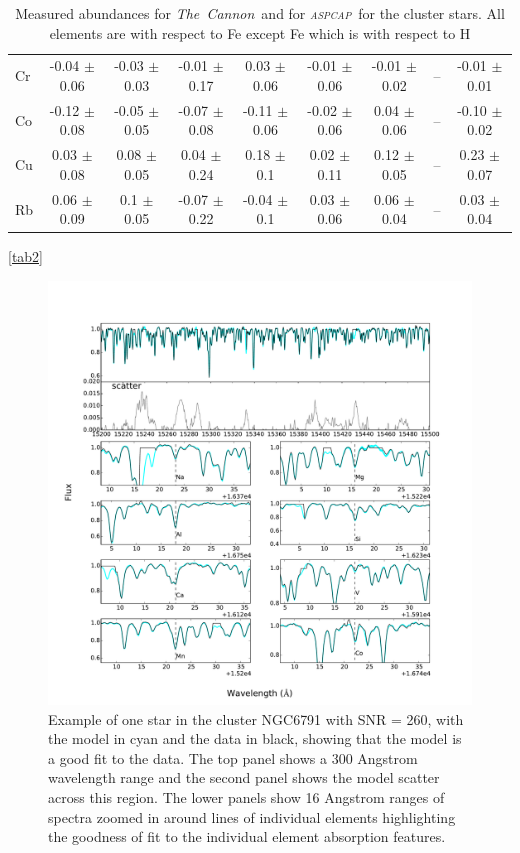 \documentclass[14pt, preprint2]{aastex6}
\newcommand{\project}[1]{\textsl{#1}}
\newcommand{\tc}{\project{The~Cannon}}
\newcommand{\aspcap}{\project{\textsc{aspcap}}}
\begin{document}
\begin{table}[h]
\begin{tabular}{ | p{} | c| c | c | c | c | c | c | c | }
Cr & -0.04 $\pm$ 0.06 &  -0.03 $\pm$ 0.03 &  -0.01 $\pm$ 0.17  & 0.03 $\pm$ 0.06 & -0.01 $\pm$ 0.06  &-0.01 $\pm$ 0.02  &  -- & -0.01 $\pm$ 0.01 \\
Co & -0.12 $\pm$ 0.08 & -0.05 $\pm$ 0.05  & -0.07 $\pm$ 0.08 & -0.11 $\pm$ 0.06 & -0.02 $\pm$ 0.06 & 0.04 $\pm$ 0.06 & --  & -0.10 $\pm$ 0.02 \\
Cu & 0.03 $\pm$ 0.08  &  0.08 $\pm$ 0.05  & 0.04 $\pm$ 0.24 & 0.18 $\pm$ 0.1  & 0.02 $\pm$ 0.11  & 0.12 $\pm$ 0.05  & --  & 0.23 $\pm$ 0.07 \\
Rb & 0.06 $\pm$ 0.09 & 0.1 $\pm$ 0.05  & -0.07 $\pm$ 0.22  & -0.04 $\pm$ 0.1 & 0.03 $\pm$ 0.06  & 0.06 $\pm$ 0.04  & --  &  0.03 $\pm$ 0.04 \\
 \hline
\end{tabular}
\caption{Measured abundances for \tc\ and for \aspcap\ for the cluster stars. All elements are with respect to Fe except Fe which is with respect to H}
\ref{tab2}
\end{table}

\begin{figure}
\centering
           \includegraphics[scale=0.5]{elementfit.pdf}
  \caption{ Example of one star in the cluster NGC6791 with SNR = 260, with the model in cyan and the data in black, showing that the model is a good fit to the data. The top panel shows a 300 Angstrom wavelength range and the second panel shows the model scatter across this region. The lower panels show 16 Angstrom ranges of spectra zoomed in around lines of individual elements highlighting the goodness of fit to the individual element absorption features. }
\label{fig:typical}
\end{figure}
\end{document}
